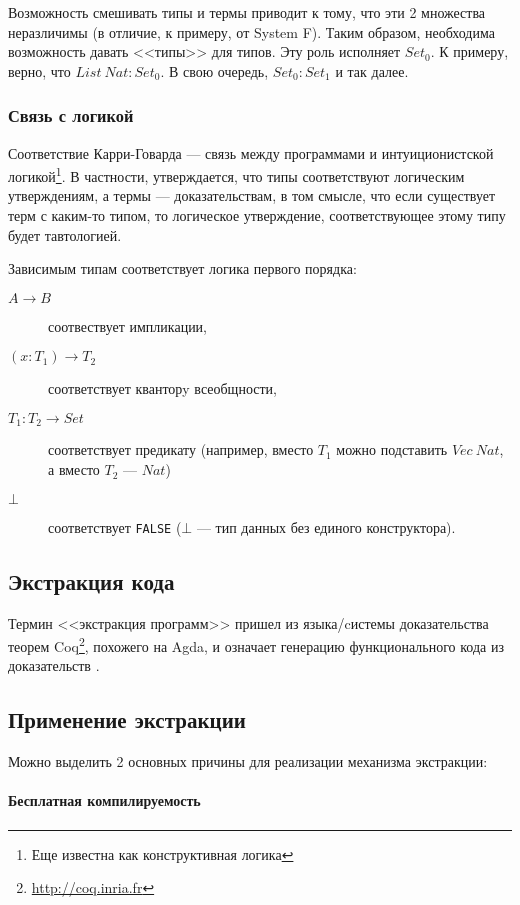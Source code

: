 Возможность смешивать типы и термы приводит к тому, что эти 2 множества неразличимы
(в отличие, к примеру, от System F). Таким образом, необходима возможность давать <<типы>>
для типов. Эту роль исполняет \(Set_0\). К примеру, верно, что \(List\ Nat : Set_0\). В свою
очередь, \(Set_0 : Set_1\) и так далее.

\subsubsection{Связь с логикой}

Соответствие Карри-Говарда --- связь между программами и интуиционистской логикой\footnote{
Еще известна как конструктивная логика}. В частности, утверждается, что типы соответствуют
логическим утверждениям, а термы --- доказательствам, в том смысле, что если существует
терм с каким-то типом, то логическое утверждение, соответствующее этому типу будет тавтологией.

Зависимым типам соответствует логика первого порядка:
\begin{description}
\item[\(A \rightarrow B\)] соотвествует импликации,
\item[\((x : T_1) \rightarrow T_2\)] соответствует кванторy всеобщности,
\item[\(T_1 : T_2 \rightarrow Set\)] соответствует предикату (например, вместо \(T_1\) можно подставить \(Vec\ Nat\),
   а вместо \(T_2\) --- \(Nat\))
\item[\(\bot\)] соответствует \texttt{FALSE} (\(\bot\) --- тип данных без единого конструктора).
\end{description}

\subsection{Экстракция кода}\label{sec:intro-extraction}

Термин <<экстракция программ>> пришел из языка/cистемы доказательства теорем
Coq\footnote{\url{http://coq.inria.fr}}, похожего на Agda, и означает генерацию
функционального кода из доказательств \cite{Let02}.

\subsection{Применение экстракции}

Можно выделить 2 основных причины для реализации механизма экстракции:

\paragraph{Бесплатная компилируемость}

